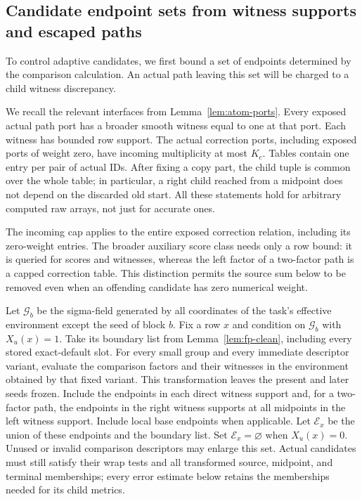 \subsection{Candidate endpoint sets from witness supports and escaped paths}

To control adaptive candidates, we first bound a set of endpoints
determined by the comparison calculation.  An actual path leaving this set
will be charged to a child witness discrepancy.

We recall the relevant interfaces from Lemma~\ref{lem:atom-ports}.
Every exposed actual path port has a broader smooth witness equal to one
at that port.  Each witness has bounded row support.  The actual
correction ports, including exposed ports of weight zero, have incoming
multiplicity at most $K_c$.  Tables contain one entry per pair of actual
IDs.  After fixing a copy part, the child tuple is common over the whole
table; in particular, a right child reached from a midpoint does not
depend on the discarded old start.  All these statements hold for
arbitrary computed raw arrays, not just for accurate ones.

The incoming cap applies to the entire exposed correction relation,
including its zero-weight entries.  The broader auxiliary score class
needs only a row bound: it is queried for scores and witnesses, whereas
the left factor of a two-factor path is a capped correction table.
This distinction permits the source sum below to be removed even when
an offending candidate has zero numerical weight.

Let $\mathcal G_b$ be the sigma-field generated by all coordinates of the
task's effective environment except the seed of block $b$.  Fix a row
$x$ and condition on $\mathcal G_b$ with $X_u(x)=1$.  Take its boundary list from
Lemma~\ref{lem:fp-clean}, including every stored exact-default slot.
For every small group and every immediate
descriptor variant, evaluate the comparison factors and their witnesses in
the environment obtained by that fixed variant.  This transformation
leaves the present and later seeds frozen.  Include the endpoints in
each direct witness support and, for a two-factor path, the endpoints
in the right witness supports at all midpoints in the left witness
support.  Include local base endpoints when applicable.  Let
$\mathcal E_x$ be the union of these endpoints and the boundary list.
Set $\mathcal E_x=\varnothing$ when $X_u(x)=0$.
Unused or invalid comparison descriptors may enlarge this set.  Actual
candidates must still satisfy their wrap tests and all transformed
source, midpoint, and terminal memberships; every error estimate below
retains the memberships needed for its child metrics.

